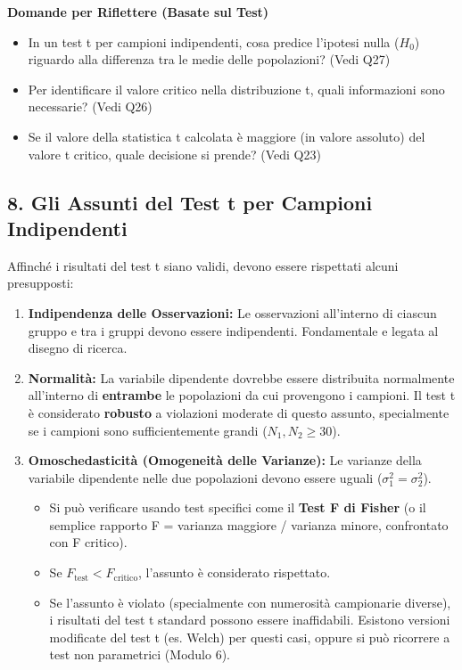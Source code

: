 \documentclass[12pt, a4paper]{article}
\newenvironment{reflectionbox}{%
    \medskip
    \begin{framed}\par\noindent
    \textbf{\color{boxtitlecolor}Domande per Riflettere (Basate sul Test)} \par
    \begin{itemize}[leftmargin=*, label=$\blacktriangleright$]
}{%
    \end{itemize}\par
    \end{framed}
    \medskip
}
\newcommand{\popvar}{\sigma^2}
\newcommand{\Hnull}{H_0} %
\begin{document}
\begin{reflectionbox}
    \item In un test t per campioni indipendenti, cosa predice l'ipotesi nulla ($\Hnull$) riguardo alla differenza tra le medie delle popolazioni? (Vedi Q27)
    \item Per identificare il valore critico nella distribuzione t, quali informazioni sono necessarie? (Vedi Q26)
    \item Se il valore della statistica t calcolata è maggiore (in valore assoluto) del valore t critico, quale decisione si prende? (Vedi Q23)
\end{reflectionbox}

\subsection*{8. Gli Assunti del Test t per Campioni Indipendenti}
Affinché i risultati del test t siano validi, devono essere rispettati alcuni presupposti:
\begin{enumerate}
    \item \textbf{Indipendenza delle Osservazioni:} Le osservazioni all'interno di ciascun gruppo e tra i gruppi devono essere indipendenti. Fondamentale e legata al disegno di ricerca.
    \item \textbf{Normalità:} La variabile dipendente dovrebbe essere distribuita normalmente all'interno di \textbf{entrambe} le popolazioni da cui provengono i campioni. Il test t è considerato \textbf{robusto} a violazioni moderate di questo assunto, specialmente se i campioni sono sufficientemente grandi ($N_1, N_2 \ge 30$).
    \item \textbf{Omoschedasticità (Omogeneità delle Varianze):} Le varianze della variabile dipendente nelle due popolazioni devono essere uguali ($\popvar_1 = \popvar_2$).
        \begin{itemize}
            \item Si può verificare usando test specifici come il \textbf{Test F di Fisher} (o il semplice rapporto F = varianza maggiore / varianza minore, confrontato con F critico).
            \item Se $F_{\text{test}} < F_{\text{critico}}$, l'assunto è considerato rispettato.
            \item Se l'assunto è violato (specialmente con numerosità campionarie diverse), i risultati del test t standard possono essere inaffidabili. Esistono versioni modificate del test t (es. Welch) per questi casi, oppure si può ricorrere a test non parametrici (Modulo 6).
        \end{itemize}
\end{enumerate}
\end{document}
